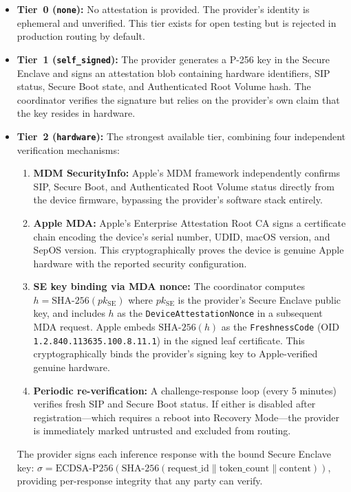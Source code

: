 \documentclass[10pt,twocolumn,letterpaper]{article}
\begin{document}
\begin{itemize}[leftmargin=*,itemsep=2pt]
    \item \textbf{Tier~0 (\texttt{none}):} No attestation is provided. The provider's identity is ephemeral and unverified. This tier exists for open testing but is rejected in production routing by default.

    \item \textbf{Tier~1 (\texttt{self\_signed}):} The provider generates a P-256 key in the Secure Enclave and signs an attestation blob containing hardware identifiers, SIP status, Secure Boot state, and Authenticated Root Volume hash. The coordinator verifies the signature but relies on the provider's own claim that the key resides in hardware.

    \item \textbf{Tier~2 (\texttt{hardware}):} The strongest available tier, combining four independent verification mechanisms:
    \begin{enumerate}[leftmargin=*,itemsep=1pt]
        \item \textbf{MDM SecurityInfo:} Apple's MDM framework independently confirms SIP, Secure Boot, and Authenticated Root Volume status directly from the device firmware, bypassing the provider's software stack entirely.
        \item \textbf{Apple MDA:} Apple's Enterprise Attestation Root CA signs a certificate chain encoding the device's serial number, UDID, macOS version, and SepOS version. This cryptographically proves the device is genuine Apple hardware with the reported security configuration.
        \item \textbf{SE key binding via MDA nonce:} The coordinator computes $h = \text{SHA-256}(pk_{\text{SE}})$ where $pk_{\text{SE}}$ is the provider's Secure Enclave public key, and includes $h$ as the \texttt{DeviceAttestationNonce} in a subsequent MDA request. Apple embeds $\text{SHA-256}(h)$ as the \texttt{FreshnessCode} (OID \texttt{1.2.840.113635.100.8.11.1}) in the signed leaf certificate. This cryptographically binds the provider's signing key to Apple-verified genuine hardware.
        \item \textbf{Periodic re-verification:} A challenge-response loop (every 5 minutes) verifies fresh SIP and Secure Boot status. If either is disabled after registration---which requires a reboot into Recovery Mode---the provider is immediately marked untrusted and excluded from routing.
    \end{enumerate}
    The provider signs each inference response with the bound Secure Enclave key: $\sigma = \text{ECDSA-P256}(\text{SHA-256}(\text{request\_id} \| \text{token\_count} \| \text{content}))$, providing per-response integrity that any party can verify.
\end{itemize}
\end{document}
